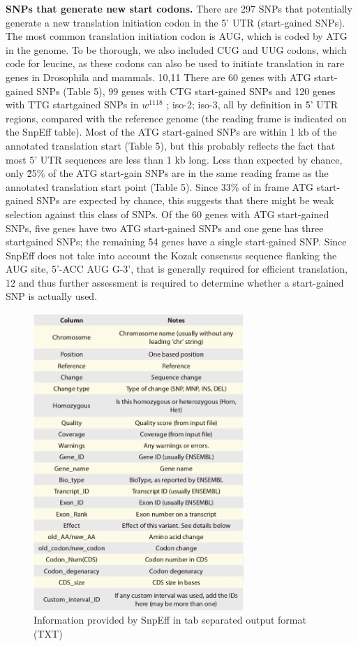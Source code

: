 \textbf{SNPs that generate new start codons.} There are 297 SNPs that potentially generate a new translation initiation codon in the 5' UTR (start-gained SNPs). The most common translation initiation codon is AUG, which is coded by ATG in the genome.  To be thorough, we also included CUG and UUG codons, which code for leucine, as these codons can also be used to initiate translation in rare genes in Drosophila and mammals. 10,11 There are 60 genes with ATG start-gained SNPs (Table 5), 99 genes with CTG start-gained SNPs and 120 genes with TTG startgained SNPs in $w^{1118}$ ; iso-2; iso-3, all by definition in 5' UTR regions, compared with the reference genome (the reading frame is indicated on the SnpEff table). Most of the ATG start-gained SNPs are within 1 kb of the annotated translation start (Table 5), but this probably reflects the fact that most 5' UTR sequences are less than 1 kb long. Less than expected by chance, only \~25\% of the ATG start-gain SNPs are in the same reading frame as the annotated translation start point (Table 5). Since 33\% of in frame ATG start-gained SNPs are expected by chance, this suggests that there might be weak selection against this class of SNPs. Of the 60 genes with ATG start-gained SNPs, five genes have two ATG start-gained SNPs and one gene has three startgained SNPs; the remaining 54 genes have a single start-gained SNP. Since SnpEff does not take into account the Kozak consensus sequence flanking the AUG site, 5'-ACC AUG G-3', that is generally required for efficient translation, 12 and thus further assessment is required to determine whether a start-gained SNP is actually used.

\begin{figure}
    \centering
    \includegraphics[width=8cm]{snpeff_table3.png}
    \caption{Information provided by SnpEff in tab separated output format
(TXT)}
    \label{fig:snpeffTab3}
\end{figure}


